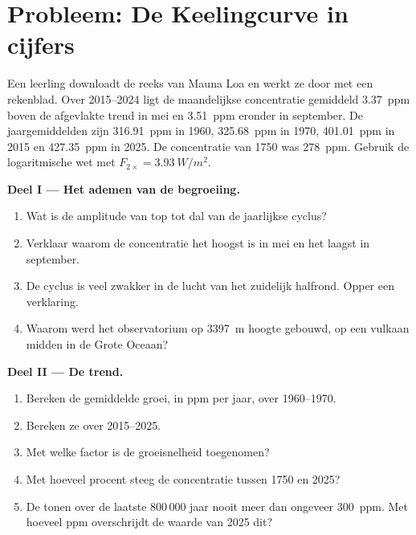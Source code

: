 \section{Probleem: De Keelingcurve in cijfers}

\begin{problem}
\label{pb:g12:climate-change:1}
Een leerling downloadt de reeks van Mauna Loa en werkt ze door met een
rekenblad. Over 2015--2024 ligt de maandelijkse concentratie gemiddeld
\qty{3.37}{ppm} boven de afgevlakte trend in mei en \qty{3.51}{ppm} eronder
in september. De jaargemiddelden zijn \qty{316.91}{ppm} in 1960,
\qty{325.68}{ppm} in 1970, \qty{401.01}{ppm} in 2015 en \qty{427.35}{ppm}
in 2025. De concentratie van 1750 was \qty{278}{ppm}. Gebruik de logaritmische
wet met $F_{2\times} = \qty{3.93}{W/m^2}$.

\medskip
\noindent\textbf{Deel I --- Het ademen van de begroeiing.}
\begin{enumerate}
  \item Wat is de amplitude van top tot dal van de jaarlijkse cyclus?
  \item Verklaar waarom de concentratie het hoogst is in mei en het laagst in
        september.
  \item De cyclus is veel zwakker in de lucht van het zuidelijk halfrond.
        Opper een verklaring.
  \item Waarom werd het observatorium op \qty{3397}{m} hoogte gebouwd, op een vulkaan
        midden in de Grote Oceaan?
\end{enumerate}

\medskip
\noindent\textbf{Deel II --- De trend.}
\begin{enumerate}[resume]
  \item Bereken de gemiddelde groei, in ppm per jaar, over 1960--1970.
  \item Bereken ze over 2015--2025.
  \item Met welke factor is de groeisnelheid toegenomen?
  \item Met hoeveel procent steeg de concentratie tussen 1750 en
        2025?
  \item De  tonen over de laatste 800\,000 jaar nooit meer dan ongeveer \qty{300}{ppm}.
        Met hoeveel ppm overschrijdt de waarde van 2025
        dit?
\end{enumerate}


\end{problem}
